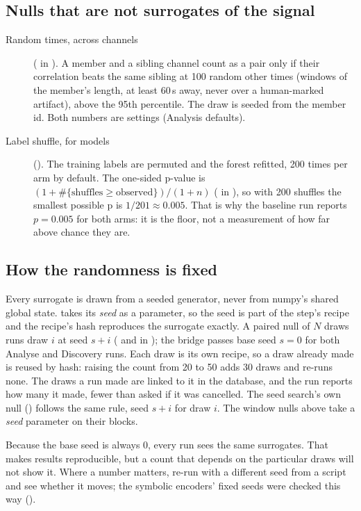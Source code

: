 \subsection{Nulls that are not surrogates of the signal}
\begin{description}
\item[Random times, across channels] ( in ).
  A member and a sibling channel count as a pair only if their correlation beats the same
  sibling at 100 random other times (windows of the member's length, at least 60\,s away,
  never over a human-marked artifact), above the 95th percentile. The draw is seeded from the
  member id. Both numbers are settings (Analysis defaults).
\item[Label shuffle, for models] (). The training labels are
  permuted and the forest refitted, 200 times per arm by default. The one-sided p-value is
  $(1 + \#\{\text{shuffles} \geq \text{observed}\})/(1 + n)$ ( in
  ), so with 200 shuffles the smallest possible p is
  $1/201 \approx 0.005$. That is why the baseline run reports $p = 0.005$ for both arms: it is
  the floor, not a measurement of how far above chance they are.
\end{description}

\subsection{How the randomness is fixed}
Every surrogate is drawn from a seeded generator, never from numpy's shared global state.
 takes its \emph{seed} as a parameter, so the seed is part
of the step's recipe and the recipe's hash reproduces the surrogate exactly. A paired null of
$N$ draws runs draw $i$ at seed $s+i$ ( and 
in ); the bridge passes base seed $s = 0$ for both Analyse and
Discovery runs. Each draw is its own recipe, so a draw already made is reused by hash:
raising the count from 20 to 50 adds 30 draws and re-runs none. The draws a run made are
linked to it in the database, and the run reports how many it made, fewer than asked if it was
cancelled. The seed search's own null () follows the same rule, seed
$s+i$ for draw $i$. The window nulls above take a \emph{seed} parameter on their blocks.

\begin{watchout}
Because the base seed is always 0, every run sees the same surrogates. That makes results
reproducible, but a count that depends on the particular draws will not show it. Where a
number matters, re-run with a different seed from a script and see whether it moves; the
symbolic encoders' fixed seeds were checked this way ().
\end{watchout}

